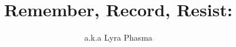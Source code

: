\documentclass[12pt]{base} %
\title{Remember, Record, Resist:}     %
\author{a.k.a Lyra Phasma}                           %
\begin{document}



\begin{romanpages}          %
\tableofcontents            %
\listoffigures              %
\listoftables				%
\end{romanpages}            %





\printbibliography

\appendix
\end{document}
